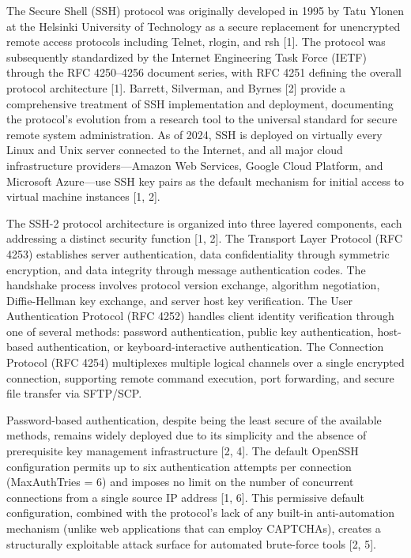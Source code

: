 \documentclass[
  a4paper]{report}
\begin{document}
The Secure Shell (SSH) protocol was originally developed in 1995 by Tatu
Ylonen at the Helsinki University of Technology as a secure replacement
for unencrypted remote access protocols including Telnet, rlogin, and
rsh {[}1{]}. The protocol was subsequently standardized by the Internet
Engineering Task Force (IETF) through the RFC 4250--4256 document
series, with RFC 4251 defining the overall protocol architecture
{[}1{]}. Barrett, Silverman, and Byrnes {[}2{]} provide a comprehensive
treatment of SSH implementation and deployment, documenting the
protocol's evolution from a research tool to the universal standard for
secure remote system administration. As of 2024, SSH is deployed on
virtually every Linux and Unix server connected to the Internet, and all
major cloud infrastructure providers---Amazon Web Services, Google Cloud
Platform, and Microsoft Azure---use SSH key pairs as the default
mechanism for initial access to virtual machine instances {[}1, 2{]}.

The SSH-2 protocol architecture is organized into three layered
components, each addressing a distinct security function {[}1, 2{]}. The
Transport Layer Protocol (RFC 4253) establishes server authentication,
data confidentiality through symmetric encryption, and data integrity
through message authentication codes. The handshake process involves
protocol version exchange, algorithm negotiation, Diffie-Hellman key
exchange, and server host key verification. The User Authentication
Protocol (RFC 4252) handles client identity verification through one of
several methods: password authentication, public key authentication,
host-based authentication, or keyboard-interactive authentication. The
Connection Protocol (RFC 4254) multiplexes multiple logical channels
over a single encrypted connection, supporting remote command execution,
port forwarding, and secure file transfer via SFTP/SCP.

Password-based authentication, despite being the least secure of the
available methods, remains widely deployed due to its simplicity and the
absence of prerequisite key management infrastructure {[}2, 4{]}. The
default OpenSSH configuration permits up to six authentication attempts
per connection (MaxAuthTries = 6) and imposes no limit on the number of
concurrent connections from a single source IP address {[}1, 6{]}. This
permissive default configuration, combined with the protocol's lack of
any built-in anti-automation mechanism (unlike web applications that can
employ CAPTCHAs), creates a structurally exploitable attack surface for
automated brute-force tools {[}2, 5{]}.
\end{document}
